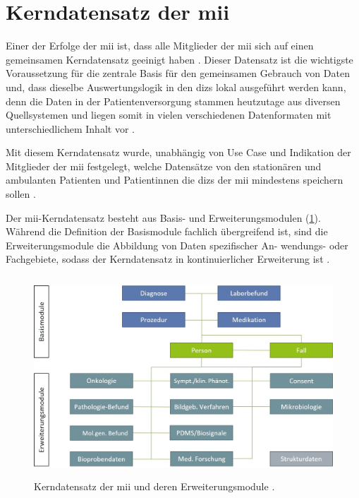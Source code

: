 \section{Kerndatensatz der \acs{mii}} \label{sec:miikdz}

Einer der Erfolge der \ac{mii} ist, dass alle Mitglieder der \ac{mii} sich auf einen gemeinsamen Kerndatensatz geeinigt haben \cite{telemedizin, miikdz}. Dieser Datensatz ist die wichtigste Voraussetzung für die zentrale Basis für den gemeinsamen Gebrauch von Daten und, dass dieselbe Auswertungslogik in den \acp{diz} lokal ausgeführt werden kann, denn die Daten in der Patientenversorgung stammen heutzutage aus diversen Quellsystemen und liegen somit in vielen verschiedenen Datenformaten mit unterschiedlichem Inhalt vor \cite{miikdz}. 

Mit diesem Kerndatensatz wurde, unabhängig von Use Case und Indikation der Mitglieder der \ac{mii} festgelegt, welche Datensätze von den stationären und ambulanten Patienten und Patientinnen die \acp{diz} der \ac{mii} mindestens speichern sollen \cite{miikdz}.

Der \ac{mii}-Kerndatensatz besteht aus Basis- und Erweiterungsmodulen (\ref{fig:mii}). Während die Definition der Basismodule fachlich übergreifend ist, sind die Erweiterungsmodule die Abbildung von Daten spezifischer An- wendungs- oder Fachgebiete, sodass der Kerndatensatz in kontinuierlicher Erweiterung ist \cite{miikdz}.

\clearpage

\begin{figure}[ht]
	\centering
	\includegraphics[height=7.5cm]{figures/MIIModule}
	\caption[Kerndatensatz der \acs{mii}]{Kerndatensatz der \acs{mii} und deren Erweiterungsmodule \cite{miikdz}.}
	\label{fig:mii}
\end{figure}

